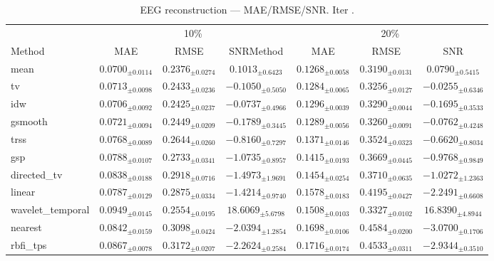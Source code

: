 ﻿%
\begin{table}[ht]
\centering
\caption[EEG reconstruction - Iteration it14]{EEG reconstruction — MAE/RMSE/SNR. Iter .}
\label{tab:main_it14_low_missing_synthetic}
\small
\begin{tabular}{lcccccc}
\toprule
\multicolumn{1}{c}{} & \multicolumn{3}{c}{10\%} & \multicolumn{3}{c}{20\%} \\
\cmidrule(lr){2-4} \cmidrule(lr){5-7}
Method & MAE & RMSE & SNRMethod & MAE & RMSE & SNR \\
\midrule
mean & $0.0700_{\pm 0.0114}$ & $0.2376_{\pm 0.0274}$ & $0.1013_{\pm 0.6423}$ & $0.1268_{\pm 0.0058}$ & $0.3190_{\pm 0.0131}$ & $0.0790_{\pm 0.5415}$ \\
tv & $0.0713_{\pm 0.0098}$ & $0.2433_{\pm 0.0236}$ & $-0.1050_{\pm 0.5050}$ & $0.1284_{\pm 0.0065}$ & $0.3256_{\pm 0.0127}$ & $-0.0255_{\pm 0.6346}$ \\
idw & $0.0706_{\pm 0.0092}$ & $0.2425_{\pm 0.0237}$ & $-0.0737_{\pm 0.4966}$ & $0.1296_{\pm 0.0039}$ & $0.3290_{\pm 0.0044}$ & $-0.1695_{\pm 0.3533}$ \\
gsmooth & $0.0721_{\pm 0.0094}$ & $0.2449_{\pm 0.0209}$ & $-0.1789_{\pm 0.3445}$ & $0.1289_{\pm 0.0056}$ & $0.3260_{\pm 0.0091}$ & $-0.0762_{\pm 0.4248}$ \\
trss & $0.0768_{\pm 0.0089}$ & $0.2644_{\pm 0.0260}$ & $-0.8160_{\pm 0.7297}$ & $0.1371_{\pm 0.0146}$ & $0.3524_{\pm 0.0323}$ & $-0.6620_{\pm 0.8034}$ \\
gsp & $0.0788_{\pm 0.0107}$ & $0.2733_{\pm 0.0341}$ & $-1.0735_{\pm 0.8957}$ & $0.1415_{\pm 0.0193}$ & $0.3669_{\pm 0.0445}$ & $-0.9768_{\pm 0.9849}$ \\
directed\_tv & $0.0838_{\pm 0.0188}$ & $0.2918_{\pm 0.0716}$ & $-1.4973_{\pm 1.9691}$ & $0.1454_{\pm 0.0254}$ & $0.3710_{\pm 0.0635}$ & $-1.0272_{\pm 1.2363}$ \\
linear & $0.0787_{\pm 0.0129}$ & $0.2875_{\pm 0.0334}$ & $-1.4214_{\pm 0.9740}$ & $0.1578_{\pm 0.0183}$ & $0.4195_{\pm 0.0427}$ & $-2.2491_{\pm 0.6608}$ \\
wavelet\_temporal & $0.0949_{\pm 0.0145}$ & $0.2554_{\pm 0.0195}$ & $18.6069_{\pm 5.6798}$ & $0.1508_{\pm 0.0103}$ & $0.3327_{\pm 0.0102}$ & $16.8390_{\pm 4.8944}$ \\
nearest & $0.0842_{\pm 0.0159}$ & $0.3098_{\pm 0.0424}$ & $-2.0394_{\pm 1.2854}$ & $0.1698_{\pm 0.0106}$ & $0.4584_{\pm 0.0200}$ & $-3.0700_{\pm 0.1706}$ \\
rbfi\_tps & $0.0867_{\pm 0.0078}$ & $0.3172_{\pm 0.0207}$ & $-2.2624_{\pm 0.2584}$ & $0.1716_{\pm 0.0174}$ & $0.4533_{\pm 0.0311}$ & $-2.9344_{\pm 0.3510}$ \\

\end{tabular}
\end{table}
